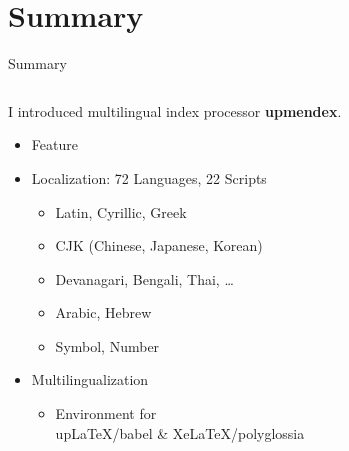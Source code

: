 \documentclass[aspectratio=169,10pt]{beamer}
\begin{document}
\section{Summary}
\begin{frame}{Summary}

\begin{columns}
\begin{column}{70mm}

I introduced multilingual index processor \textbf{upmendex}.

  \begin{itemize}
  \item Feature\\
  \item Localization: 72 Languages, 22 Scripts
     \begin{itemize}
      \item Latin, Cyrillic, Greek
      \item CJK (Chinese, Japanese, Korean)
      \item Devanagari, Bengali, Thai, \ldots
      \item Arabic, Hebrew
      \item Symbol, Number
     \end{itemize}
  \item Multilingualization
     \begin{itemize}
      \item Environment for\\
        upLaTeX/babel \& XeLaTeX/polyglossia
     \end{itemize}
  \end{itemize}
\end{column}

\begin{column}{65mm}

\begin{center}
\end{center}
\end{column}
\end{columns}

\end{frame}

\end{document}
